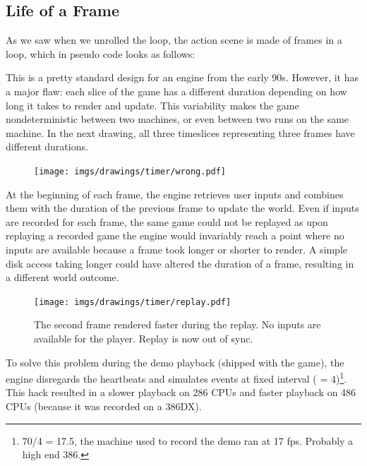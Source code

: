 \subsection{Life of a Frame}
As we saw when we unrolled the loop, the action scene is made of frames in a loop, which in pseudo code looks as follows:\\
\par
\begin{minipage}{\textwidth}
 
 \end{minipage}
\par
This is a pretty standard design for an engine from the early 90s. However, it has a major flaw: each slice of the game has a different duration depending on how long it takes to render and update. This variability makes the game nondeterministic between two machines, or even between two runs on the same machine. In the next drawing, all three timeslices representing three frames have different durations.\\
\begin{figure}[H]
\centering
 \texttt{[image: imgs/drawings/timer/wrong.pdf]}
 
 \end{figure}
  At the beginning of each frame, the engine retrieves user inputs and combines them with the duration of the previous frame to update the world. Even if inputs are recorded for each frame, the same game could not be replayed as upon replaying a recorded game the engine would invariably reach a point where no inputs are available because a frame took longer or shorter to render. A simple disk access taking longer could have altered the duration of a frame, resulting in a different world outcome.\\
 \begin{figure}[H]
\centering
 \texttt{[image: imgs/drawings/timer/replay.pdf]}
 \caption{The second frame rendered faster during the replay. No inputs are available for the player. Replay is now out of sync.}
 \end{figure}
\par
To solve this problem during the demo playback (shipped with the game), the engine disregards the heartbeats and simulates events at fixed interval ( = 4)\footnote{70/4 = 17.5, the machine used to record the demo ran at 17 fps. Probably a high end 386.}. This hack resulted in a slower playback on 286 CPUs and faster playback on 486 CPUs (because it was recorded on a 386DX).\\
